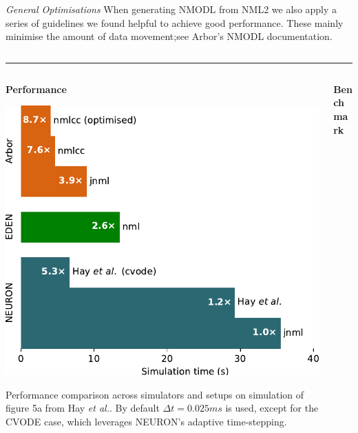\documentclass{beamer}
\begin{document}
\begin{frame}[t, fragile]
\begin{columns}[t]
\begin{column}{0.49\textwidth}
      \emph{General Optimisations} When generating NMODL from NML2 we also apply
      a series of guidelines we found helpful to achieve good performance. These
      mainly minimise the amount of data movement;\@ see Arbor's NMODL
      documentation.
    \end{column}
  \end{columns}
  \vspace*{1ex}
  \textcolor{arborange}{\rule{\textwidth}{0.5ex}}
  \vspace*{-1ex}
  \begin{columns}
    \begin{column}{0.73\textwidth}
      \begin{columns}[t]
        \begin{column}[t]{0.45\textwidth}
          \textbf{Performance}
          \vspace*{1ex}

          \includegraphics[width=\textwidth]{./benchmark/barchart_cropped.pdf}

          Performance comparison across simulators and setups on simulation of
          figure 5a from Hay \emph{et al.}. By default $\Delta t = 0.025ms$ is used,
          except for the CVODE case, which leverages NEURON's adaptive time-stepping.
        \end{column}
        \begin{column}[t]{0.53\textwidth}
          \textbf{Benchmark}


\end{column}
\end{columns}
\end{column}
\end{columns}
\end{frame}
\end{document}
